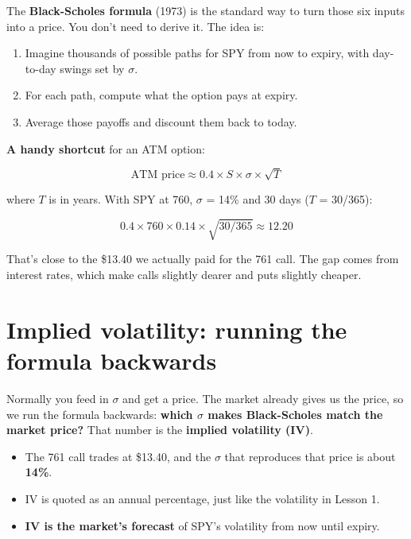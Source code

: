 \documentclass{article}
\begin{document}
The \textbf{Black-Scholes formula} (1973) is the standard way to turn those six inputs into a price. You don't need to derive it. The idea is:

\begin{enumerate}

\item Imagine thousands of possible paths for SPY from now to expiry, with day-to-day swings set by $\sigma$.

\item For each path, compute what the option pays at expiry.

\item Average those payoffs and discount them back to today.

\end{enumerate}

\textbf{A handy shortcut} for an ATM option:

\[\text{ATM price} \approx 0.4 \times S \times \sigma \times \sqrt{T}\]

where $T$ is in years. With SPY at 760, $\sigma$ = 14\% and 30 days ($T$ = 30/\allowbreak{}365):

\[0.4 \times 760 \times 0.14 \times \sqrt{30/365} \approx 12.20\]

That's close to the \$13.40 we actually paid for the 761 call. The gap comes from interest rates, which make calls slightly dearer and puts slightly cheaper.

\section{Implied volatility: running the formula backwards}

Normally you feed in $\sigma$ and get a price. The market already gives us the price, so we run the formula backwards: \textbf{which $\sigma$ makes Black-Scholes match the market price?} That number is the \textbf{implied volatility (IV)}.

\begin{itemize}

\item The 761 call trades at \$13.40, and the \ensuremath{\sigma} that reproduces that price is about \textbf{14\%}.

\item IV is quoted as an annual percentage, just like the volatility in Lesson 1.

\item \textbf{IV is the market's forecast} of SPY's volatility from now until expiry.

\end{itemize}
\end{document}
